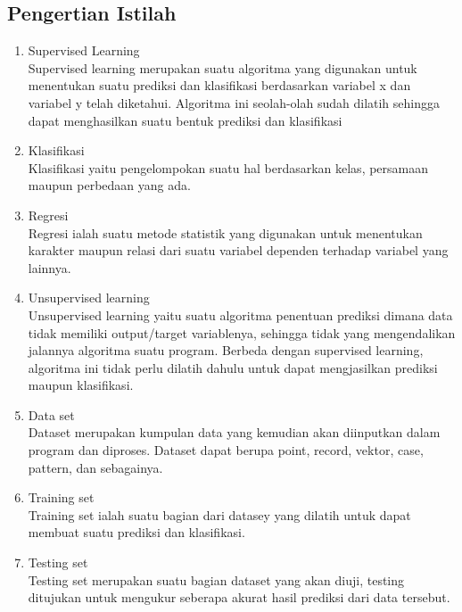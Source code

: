 \subsection{Pengertian Istilah}
\begin{enumerate}
\item Supervised Learning\\
Supervised learning merupakan suatu algoritma yang digunakan untuk menentukan suatu prediksi dan klasifikasi berdasarkan variabel x dan variabel y telah diketahui. Algoritma ini seolah-olah sudah dilatih sehingga dapat menghasilkan suatu bentuk prediksi dan klasifikasi
    \item Klasifikasi\\
    Klasifikasi yaitu pengelompokan suatu hal berdasarkan kelas, persamaan maupun perbedaan yang ada.
    \item Regresi\\
    Regresi ialah suatu metode statistik yang digunakan untuk menentukan karakter maupun relasi dari suatu variabel dependen terhadap variabel yang lainnya.
    \item Unsupervised learning\\
    Unsupervised learning yaitu suatu algoritma penentuan prediksi dimana data tidak memiliki output/target variablenya, sehingga tidak yang mengendalikan jalannya algoritma suatu program. Berbeda dengan supervised learning, algoritma ini tidak perlu dilatih dahulu untuk dapat mengjasilkan prediksi maupun klasifikasi.
    \item Data set\\
    Dataset merupakan kumpulan data yang kemudian akan diinputkan dalam program dan diproses. Dataset dapat berupa point, record, vektor, case, pattern, dan sebagainya.
    \item Training set\\
    Training set ialah suatu bagian dari datasey yang dilatih untuk dapat membuat suatu prediksi dan klasifikasi.
    \item Testing set\\
    Testing set merupakan suatu bagian dataset yang akan diuji, testing ditujukan untuk mengukur seberapa akurat hasil prediksi dari data tersebut.\\
\end{enumerate}
